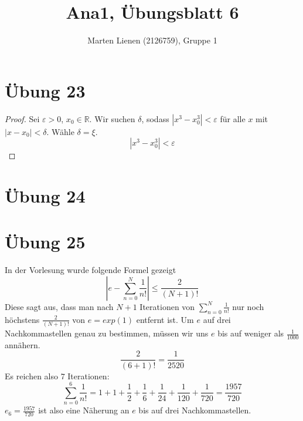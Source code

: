 \documentclass[a4paper,10pt]{article}
\title{Ana1, Übungsblatt 6}
\author{Marten Lienen (2126759), Gruppe 1}
\begin{document}
\maketitle

\section*{Übung 23}

\begin{proof}
 Sei $\varepsilon > 0$, $x_0 \in \mathbb{R}$.
 Wir suchen $\delta$, sodass $|x^3 - x_0^3| < \varepsilon$ für alle $x$ mit $|x - x_0| < \delta$.
 Wähle $\delta = \xi$.
 \begin{equation}
  |x^3 - x_0^3| < \varepsilon
 \end{equation}

\end{proof}

\section*{Übung 24}

\section*{Übung 25}

In der Vorlesung wurde folgende Formel gezeigt
\begin{equation}
 |e - \sum_{n = 0}^N \frac{1}{n!}| \le \frac{2}{(N + 1)!}
\end{equation}
Diese sagt aus, dass man nach $N + 1$ Iterationen von $\sum_{n = 0}^N \frac{1}{n!}$ nur noch höchstens $\frac{2}{(N + 1)!}$ von $e = exp(1)$ entfernt ist.
Um $e$ auf drei Nachkommastellen genau zu bestimmen, müssen wir uns $e$ bis auf weniger als $\frac{1}{1000}$ annähern.
\begin{equation}
 \frac{2}{(6 + 1)!} = \frac{1}{2520}
\end{equation}
Es reichen also $7$ Iterationen:
\begin{equation}
 \sum_{n = 0}^6 \frac{1}{n!} = 1 + 1 + \frac{1}{2} + \frac{1}{6} + \frac{1}{24} + \frac{1}{120} + \frac{1}{720} = \frac{1957}{720}
\end{equation}
$e_6 = \frac{1957}{720}$ ist also eine Näherung an $e$ bis auf drei Nachkommastellen.
\end{document}
